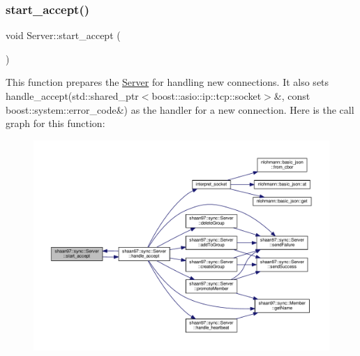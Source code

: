 \subsubsection{\texorpdfstring{start\+\_\+accept()}{start\_accept()}}
{\footnotesize\ttfamily void Server\+::start\+\_\+accept (\begin{DoxyParamCaption}{ }\end{DoxyParamCaption})\hspace{0.3cm}{\ttfamily [private]}}

This function prepares the \hyperlink{classshaan97_1_1sync_1_1_server}{Server} for handling new connections. It also sets {\ttfamily handle\+\_\+accept(std\+::shared\+\_\+ptr$<$boost\+::asio\+::ip\+::tcp\+::socket$>$\&, const boost\+::system\+::error\+\_\+code\&)} as the handler for a new connection. Here is the call graph for this function\+:\nopagebreak
\begin{figure}[H]
\begin{center}
\leavevmode
\includegraphics[width=350pt]{group___connection_handling_gab19cf3e5b775cd1b4eeb6d936340e712_cgraph}
\end{center}
\end{figure}
